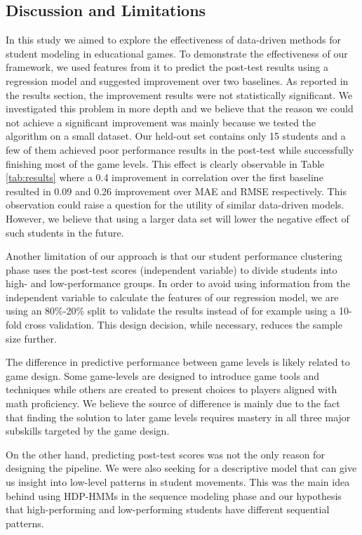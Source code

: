 \documentclass{sigchi}
\begin{document}
\subsection{Discussion and Limitations}
In this study we aimed to explore the effectiveness of data-driven methods for student modeling in educational games. 
To demonstrate the effectiveness of our framework, we used features from it to predict the post-test results using a regression model and suggested improvement over two  baselines.
As reported in the results section, the improvement results were not statistically significant. We investigated this problem in more depth and we believe that the reason we could not achieve a significant improvement was mainly because we tested the algorithm on a small dataset.
Our held-out set contains only 15 students and a few of them achieved poor performance results in the post-test while successfully finishing most of the game levels.
This effect is clearly observable in Table \ref{tab:results} where a 0.4 improvement in correlation over the first baseline resulted in 0.09 and 0.26 improvement over MAE and RMSE respectively. 
This observation could raise a question for the utility of similar data-driven models.
However, we believe that using a larger data set will lower the negative effect of such students in the future.

Another limitation of our approach is that our student performance clustering phase uses the post-test scores (independent variable) to divide students into high- and low-performance groups. 
In order to avoid using information from the independent variable to calculate the features of our regression model, we are using an 80\%-20\% split to validate the results instead of for example using a 10-fold cross validation.
This design decision, while necessary, reduces the sample size further.

The difference in predictive performance between game levels is likely related to game design. 
Some game-levels are designed to introduce game tools and techniques while others are created to present choices to players aligned with math proficiency.
We believe the source of difference is mainly due to the fact that finding the solution to later game levels requires mastery in all three major subskills targeted by the game design.

On the other hand, predicting post-test scores was not the only reason for designing the pipeline.
We were also seeking for a descriptive model that can give us insight into low-level patterns in student movements. 
This was the main idea behind using HDP-HMMs in the sequence modeling phase and our hypothesis that high-performing and low-performing students have different sequential patterns. 
\end{document}
